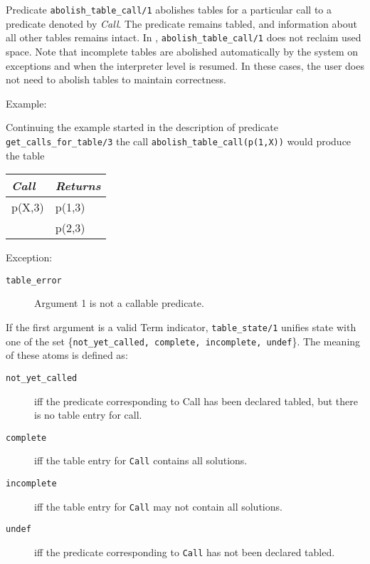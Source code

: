 \begin{description}
%
Predicate {\tt abolish\_table\_call/1} abolishes tables for a
particular call to a predicate denoted by {\em Call}.  The predicate
remains tabled, and information about all other tables remains intact.
In \version, {\tt abolish\_table\_call/1} does not reclaim used space.
Note that incomplete tables are abolished automatically by the system
on exceptions and when the interpreter level is resumed.  In these
cases, the user does not need to abolish tables to maintain
correctness.

Example:

    Continuing the example started in the description of predicate
    {\tt get\_calls\_for\_table/3} the call
    {\tt abolish\_table\_call(p(1,X))} would produce the table
    \begin{center}
    \begin{tabular}{||l|l||}               \hline
    {\em Call}			& {\em Returns} \\ \hline \hline
    p(X,3)			& p(1,3) \\ 
	       			& p(2,3) \\ \hline
    \end{tabular}
    \end{center}

Exception:
    \begin{description}
    \item[{\tt table\_error}]
	Argument 1 is not a callable predicate.
    \end{description}


If the first argument is a valid Term indicator, {\tt table\_state/1}
unifies state with one of the set 
	\{{\tt not\_yet\_called, complete, incomplete, undef}\}.
The meaning of these atoms is defined as:
\begin{description}
\item[{\tt not\_yet\_called}] iff the predicate corresponding to
Call has been declared tabled, but there is no table entry for call.
\item[{\tt complete}] iff the table entry for {\tt Call} contains
all solutions.
\item[{\tt incomplete}] iff the table entry for {\tt Call} may not contain
all solutions.
\item[{\tt undef}] iff the predicate corresponding to {\tt Call} 
has not been declared tabled.
\end{description}


\end{description}
